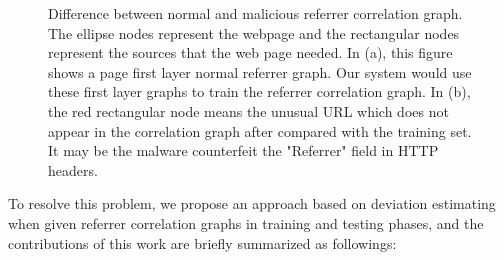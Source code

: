 \begin{figure}[!tbp]
  \centering
  \hfill
  \caption{Difference between normal and malicious referrer correlation graph. The ellipse nodes represent the webpage and the rectangular nodes represent the sources that the web page needed.
In (a), this figure shows a page first layer normal referrer graph. Our system would use these first layer graphs to train the referrer correlation graph.
In (b), the red rectangular node means the unusual URL which does not appear in the correlation graph after compared with the training set.  It may be the malware counterfeit the "Referrer" field in HTTP headers.}
\label{fig:length_count}
\end{figure}

To resolve this problem, we propose an approach based on deviation estimating when given referrer correlation graphs in training and testing phases, and the contributions of this work are briefly summarized as followings:

